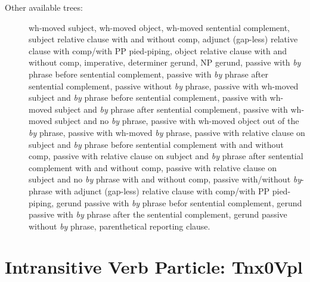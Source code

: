 \begin{description}
\item[Other available trees:] wh-moved subject, wh-moved object, wh-moved
sentential complement, subject relative clause with and without comp, 
adjunct (gap-less) relative clause with comp/with PP pied-piping, 
object relative clause with and without comp,
imperative, determiner gerund, NP gerund, passive with {\it by} phrase
before sentential complement, passive with {\it by} phrase after sentential
complement, passive without {\it by} phrase, passive with wh-moved subject
and {\it by} phrase before sentential complement, passive with wh-moved
subject and {\it by} phrase after sentential complement, passive with
wh-moved subject and no {\it by} phrase, passive with wh-moved object out
of the {\it by} phrase, passive with wh-moved {\it by} phrase, passive with
relative clause on subject and {\it by} phrase before sentential
complement with and without comp, passive with relative clause on subject and {\it by} phrase
after sentential complement with and without comp, 
passive with relative clause on subject and no {\it by} phrase with and without comp,
passive with/without {\it by}-phrase with adjunct (gap-less) relative clause
with comp/with PP pied-piping, gerund passive with {\it by} phrase befor sentential
complement, gerund passive with {\it by} phrase after the sentential
complement, gerund passive without {\it by} phrase, parenthetical
reporting clause.

\end{description}



\section{Intransitive Verb Particle: Tnx0Vpl}
\label{nx0Vpl}

